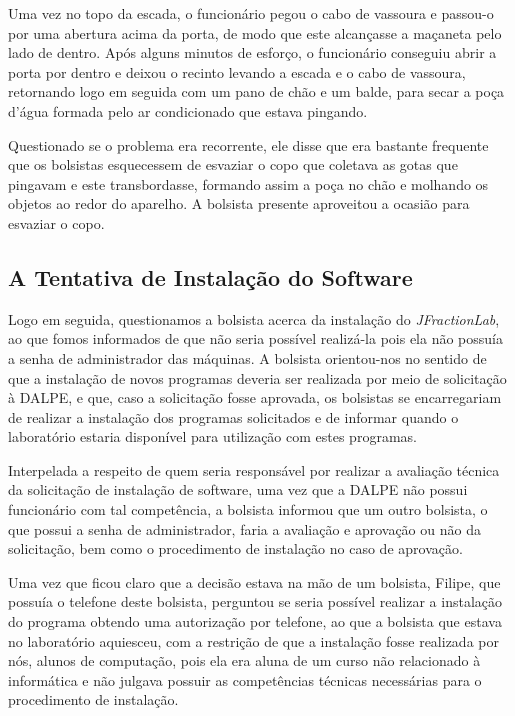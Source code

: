 Uma vez no topo da escada, o funcionário pegou o cabo de vassoura e passou-o por uma abertura acima da porta, de modo que este alcançasse a maçaneta pelo lado de dentro. Após alguns minutos de esforço, o funcionário conseguiu abrir a porta por dentro e deixou o recinto levando a escada e o cabo de vassoura, retornando logo em seguida com um pano de chão e um balde, para secar a poça d’água formada pelo ar condicionado que estava pingando.

Questionado se o problema era recorrente, ele disse que era bastante frequente que os bolsistas esquecessem de esvaziar o copo que coletava as gotas que pingavam e este transbordasse, formando assim a poça no chão e molhando os objetos ao redor do aparelho. A bolsista presente aproveitou a ocasião para esvaziar o copo. 

\subsection{A Tentativa de Instalação do Software}\label{sec:LABEL_CHP_REL_SEC_REL_SUBSEC_INST}

Logo em seguida, questionamos a bolsista acerca da instalação do \textit{JFractionLab}, ao que fomos informados de que não seria possível realizá-la pois ela não possuía a senha de administrador das máquinas. A bolsista orientou-nos no sentido de que a instalação de novos programas deveria ser realizada por meio de solicitação à DALPE, e que, caso a solicitação fosse aprovada, os bolsistas se encarregariam de realizar a instalação dos programas solicitados e de informar quando o laboratório estaria disponível para utilização com estes programas.

Interpelada a respeito de quem seria responsável por realizar a avaliação técnica da solicitação de instalação de software, uma vez que a DALPE não possui funcionário com tal competência, a bolsista informou que um outro bolsista, o que possui a senha de administrador, faria a avaliação e aprovação ou não da solicitação, bem como o procedimento de instalação no caso de aprovação.

Uma vez que ficou claro que a decisão estava na mão de um bolsista, Filipe, que possuía o telefone deste bolsista, perguntou se seria possível realizar a instalação do programa obtendo uma autorização por telefone, ao que a bolsista que estava no laboratório aquiesceu, com a restrição de que a instalação fosse realizada por nós, alunos de computação, pois ela era aluna de um curso não relacionado à informática e não julgava possuir as competências técnicas necessárias para o procedimento de instalação.

